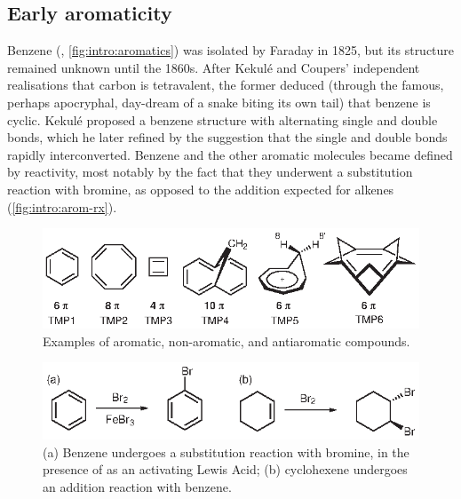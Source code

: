 	\subsection{Early aromaticity}

		Benzene (, \autoref{fig:intro:aromatics}) was isolated by Faraday in 1825, but its structure remained unknown until the 1860s. After Kekul\'e and Coupers' independent realisations that carbon is tetravalent,\autocite{Kekule1858,couper1858nouvelle} the former deduced (through the famous, perhaps apocryphal, day-dream of a snake biting its own tail) that benzene is cyclic.\autocite{kekule1865constitution} Kekul\'e proposed a benzene structure with alternating single and double bonds, which he later refined by the suggestion that the single and double bonds rapidly interconverted.\autocite{kekule1866untersuchungen} Benzene and the other aromatic molecules became defined by reactivity, most notably by the fact that they underwent a substitution reaction with bromine, as opposed to the addition expected for alkenes (\autoref{fig:intro:arom-rx}). 

		\begin{figure}[ht!]
			\centering\includegraphics{figures/intro/aromatics.eps} 
			\caption[]{Examples of aromatic, non-aromatic, and antiaromatic compounds.}
			\label{fig:intro:aromatics}
		\end{figure}

		\begin{figure}[ht!]
			\centering\includegraphics{figures/intro/arom-rx.eps} 
			\caption[]{(a) Benzene undergoes a substitution reaction with bromine, in the presence of  as an activating Lewis Acid; (b) cyclohexene undergoes an addition reaction with benzene.}
			\label{fig:intro:arom-rx}
		\end{figure}

